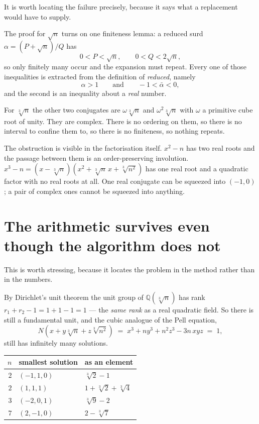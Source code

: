 \documentclass[12pt,a4paper]{article}
\theoremstyle{plain}
\theoremstyle{definition}
\begin{document}
It is worth locating the failure precisely, because it says what a replacement would have to supply.

The proof for $\sqrt n$ turns on one finiteness lemma: a reduced surd $\alpha = (P+\sqrt n)/Q$ has
\[
  0 < P < \sqrt n, \qquad 0 < Q < 2\sqrt n ,
\]
so only finitely many occur and the expansion must repeat. Every one of those inequalities is extracted from the definition of \emph{reduced}, namely
\[
  \alpha > 1 \qquad\text{and}\qquad -1 < \bar\alpha < 0 ,
\]
and the second is an inequality about a \emph{real} number.

For $\sqrt[3]{n}$ the other two conjugates are $\omega\sqrt[3]{n}$ and $\omega^2\sqrt[3]{n}$ with $\omega$ a primitive cube root of unity. They are complex. There is no ordering on them, so there is no interval to confine them to, so there is no finiteness, so nothing repeats.

\begin{tcolorbox}[colback=blue!6, colframe=blue!45!black, arc=2mm]
The obstruction is visible in the factorisation itself. $x^2-n$ has two real roots and the passage between them is an order-preserving involution. $x^3-n = (x-\sqrt[3]{n})(x^2 + \sqrt[3]{n}\,x + \sqrt[3]{n^2})$ has one real root and a quadratic factor with no real roots at all. One real conjugate can be squeezed into $(-1,0)$; a pair of complex ones cannot be squeezed into anything.
\end{tcolorbox}

\section{The arithmetic survives even though the algorithm does not}

This is worth stressing, because it locates the problem in the method rather than in the numbers.

By Dirichlet's unit theorem the unit group of $\mathbb{Q}(\sqrt[3]{n})$ has rank $r_1 + r_2 - 1 = 1 + 1 - 1 = 1$ --- the \emph{same rank} as a real quadratic field. So there is still a fundamental unit, and the cubic analogue of the Pell equation,
\[
  N(x + y\sqrt[3]{n} + z\sqrt[3]{n^2}) \;=\; x^3 + n y^3 + n^2 z^3 - 3n\,xyz \;=\; 1,
\]
still has infinitely many solutions.

\begin{center}
\begin{tabular}{rll}
\toprule
$n$ & smallest solution & as an element \\
\midrule
$2$ & $(-1,1,0)$ & $\sqrt[3]{2}-1$ \\
$2$ & $(1,1,1)$  & $1+\sqrt[3]{2}+\sqrt[3]{4}$ \\
$3$ & $(-2,0,1)$ & $\sqrt[3]{9}-2$ \\
$7$ & $(2,-1,0)$ & $2-\sqrt[3]{7}$ \\
\bottomrule
\end{tabular}
\end{center}
\end{document}
